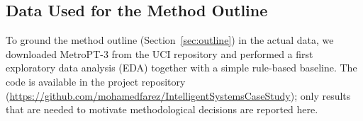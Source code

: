 \documentclass[12pt,a4paper]{article}
\begin{document}
\subsection{Data Used for the Method Outline}
To ground the method outline (Section~\ref{sec:outline}) in the actual data, we downloaded MetroPT-3 from the UCI repository \citep{davari2021metropt3data} and performed a first exploratory data analysis (EDA) together with a simple rule-based baseline. The code is available in the project repository (\url{https://github.com/mohamedfarez/IntelligentSystemsCaseStudy}); only results that are needed to motivate methodological decisions are reported here.


\clearpage
{\small


}
\end{document}
